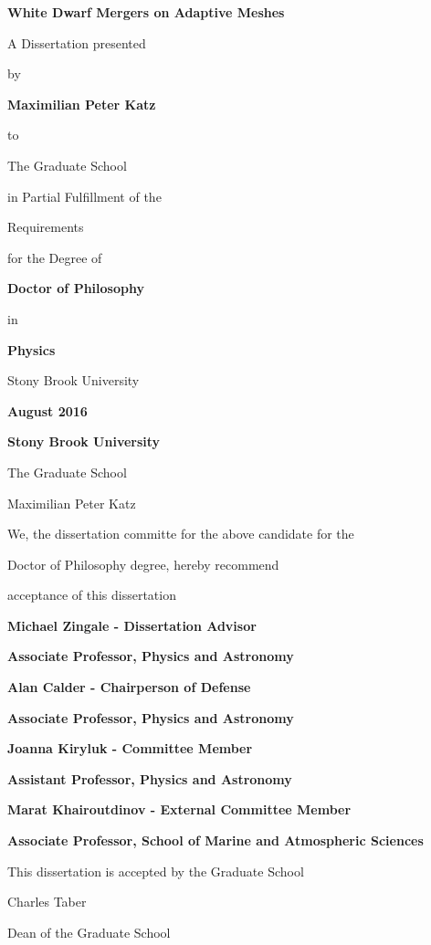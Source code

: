 \documentclass[12pt]{article}
\begin{document}
\vspace*{3\baselineskip}
\centerline{\bf{White Dwarf Mergers on Adaptive Meshes}}
\vspace*{1\baselineskip}
\centerline{A Dissertation presented}
\vspace*{1\baselineskip}
\centerline{by} 
\vspace*{1\baselineskip}
\centerline{\bf{Maximilian Peter Katz}}
\vspace*{1\baselineskip}
\centerline{to} 
\vspace*{1\baselineskip}
\centerline{The Graduate School}
\vspace*{1\baselineskip}
\centerline{in Partial Fulfillment of the}
\vspace*{1\baselineskip}
\centerline{Requirements}
\vspace*{1\baselineskip}
\centerline{for the Degree of}
\vspace*{1\baselineskip}
\centerline{\bf{Doctor of Philosophy}}
\vspace*{1\baselineskip}
\centerline{in}
\vspace*{1\baselineskip}
\centerline{\bf{Physics}}
\vspace*{2\baselineskip}
\centerline{Stony Brook University}
\vspace*{2\baselineskip}
\centerline{\bf{August 2016}}     

\newpage
{}
\setcounter{page}{2}

\centerline{\bf{Stony Brook University}}
\vspace*{1\baselineskip}
\centerline{The Graduate School}
\vspace*{2\baselineskip}
\centerline{Maximilian Peter Katz}
\vspace*{2\baselineskip}
\centerline{We, the dissertation committe for the above candidate for the}
\vspace*{1\baselineskip}
\centerline{Doctor of Philosophy degree, hereby recommend}
\vspace*{1\baselineskip}
\centerline{acceptance of this dissertation}
\vspace*{2\baselineskip}
\centerline{\bf{Michael Zingale - Dissertation Advisor}}
\centerline{\bf{Associate Professor, Physics and Astronomy}}
\vspace*{2\baselineskip}
\centerline{\bf{Alan Calder - Chairperson of Defense}}
\centerline{\bf{Associate Professor, Physics and Astronomy}}
\vspace*{2\baselineskip}
\centerline{\bf{Joanna Kiryluk - Committee Member}}
\centerline{\bf{Assistant Professor, Physics and Astronomy}} 
\vspace*{2\baselineskip}
\centerline{\bf{Marat Khairoutdinov - External Committee Member}}
\centerline{\bf{Associate Professor, School of Marine and Atmospheric Sciences}}
\vspace*{2\baselineskip}
\centerline{This dissertation is accepted by the Graduate School}
\vspace*{3\baselineskip}
\centerline{Charles Taber}
\centerline{Dean of the Graduate School}
\end{document}
